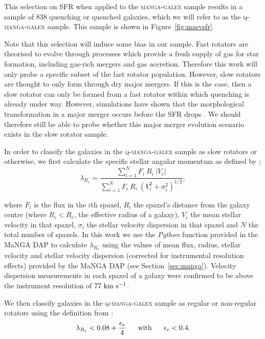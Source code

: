 \documentclass[useAMS,usenatbib]{mn2e}
\begin{document}
This selection on SFR when applied to the \textsc{manga-galex} sample results in a sample of $838$ quenching or quenched galaxies, which we will refer to as the \textsc{q-manga-galex} sample. This sample is shown in Figure~\ref{fig:masvsfr}.

Note that this selection will induce some bias in our sample. Fast rotators are theorised to evolve through processes which provide a fresh supply of gas for star formation, including gas-rich mergers and gas accretion. Therefore this work will only probe a specific subset of the fast rotator population. However, slow rotators are thought to only form through dry major mergers. If this is the case, then a slow rotator can only be formed from a fast rotator within which quenching is already under way. However, simulations have shown that the morphological transformation in a major merger occurs before the SFR drops \cite[e.g. see][]{sparre16}. We should therefore still be able to probe whether this major merger evolution scenario exists in the slow rotator sample.  

In order to classify the galaxies in the \textsc{q-manga-galex} sample as slow rotators or otherwise, we first calculate the specific stellar angular momentum as defined by \cite{emsellem07, emsellem11};
\begin{equation}
\lambda_{R_{e}} = \frac{\sum_{i=1}^{N} F_i\ R_i\ |V_i|}{\sum_{i=1}^{N} F_i\ R_i\ (V_i^2 + \sigma_i^2)^{1/2}},
\end{equation}	

where $F_i$ is the flux in the $i$th spaxel, $R_i$ the spaxel's distance from the galaxy centre (where $R_i < R_e$, the effective radius of a galaxy), $V_i$ the mean stellar velocity in that spaxel, $\sigma_i$ the stellar velocity dispersion in that spaxel and $N$ the total number of spaxels. In this work we use the \emph{Python} function provided in the MaNGA DAP to calculate $\lambda_{R_{e}}$ using the values of mean flux, radius, stellar velocity and stellar velocity dispersion (corrected for instrumental resolution effects) provided  by the MaNGA DAP (see Section~\ref{sec:manga}). Velocity dispersion measurements in each spaxel of a galaxy were confirmed to be above the instrument resolution of $77~\rm{km}~\rm{s}^{-1}$.

We then classify galaxies in the \textsc{q-manga-galex} sample as regular or non-regular rotators using the definition from \cite{cappellari16}:
\begin{equation}
\lambda_{R_{e}} < 0.08 + \frac{\epsilon_e}{4} ~~~~~ \rm{with} ~~~~~ \epsilon_e < 0.4.
\end{equation}
\end{document}
